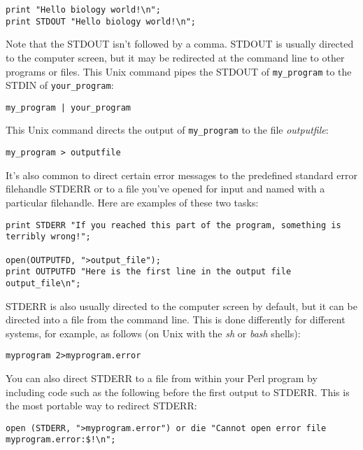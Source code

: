 \begin{lstlisting}
print "Hello biology world!\n";
print STDOUT "Hello biology world!\n";
\end{lstlisting}

Note that the STDOUT isn't followed by a comma. STDOUT is usually directed to the computer screen, but it may be redirected at the command line to other programs or files. This Unix command pipes the STDOUT of \verb|my_program| to the STDIN of \verb|your_program|:

\begin{lstlisting}
my_program | your_program 
\end{lstlisting} 

This Unix command directs the output of \verb|my_program| to the file \textit{outputfile}:

\begin{lstlisting}
my_program > outputfile
\end{lstlisting}

It's also common to direct certain error messages to the predefined standard error filehandle STDERR or to a file you've opened for input and named with a particular filehandle. Here are examples of these two tasks:

\begin{lstlisting}
print STDERR "If you reached this part of the program, something is terribly wrong!";

open(OUTPUTFD, ">output_file");
print OUTPUTFD "Here is the first line in the output file output_file\n";
\end{lstlisting}

STDERR is also usually directed to the computer screen by default, but it can be directed into a file from the command line. This is done differently for different systems, for example, as follows (on Unix with the \textit{sh} or \textit{bash} shells):

\begin{lstlisting}
myprogram 2>myprogram.error
\end{lstlisting}

You can also direct STDERR to a file from within your Perl program by including code such as the following before the first output to STDERR. This is the most portable way to redirect STDERR:

\begin{lstlisting}
open (STDERR, ">myprogram.error") or die "Cannot open error file myprogram.error:$!\n";
\end{lstlisting}

